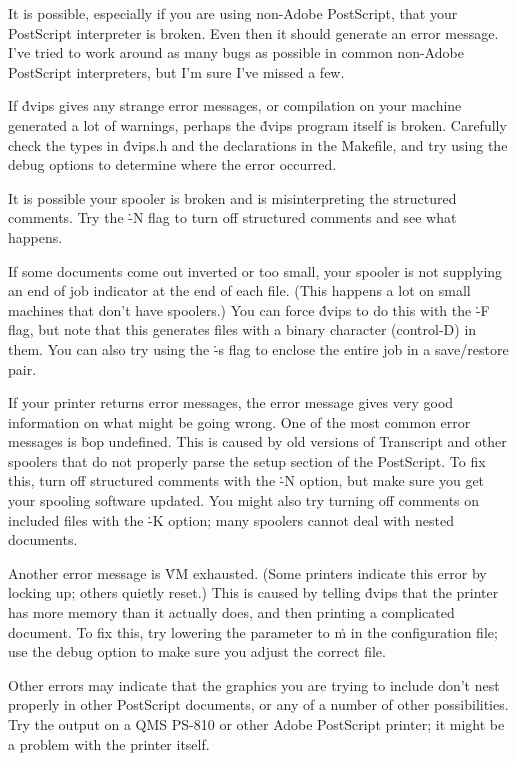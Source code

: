 It is possible, especially if you are using non-Adobe PostScript,
that your PostScript interpreter is broken.  Even then it should
generate an error message.  I've tried to work around as many bugs
as possible in common non-Adobe PostScript interpreters, but I'm
sure I've missed a few.

If \.{dvips} gives any strange error messages, or compilation on your
machine generated a lot of warnings, perhaps the \.{dvips} program
itself is broken.  Carefully check the types in \.{dvips.h} and
the declarations in the \.{Makefile}, and try using the debug options
to determine where the error occurred.

It is possible your spooler is broken and is misinterpreting the
structured comments.  Try the \.{-N} flag to turn off
structured comments and see what happens.


If some documents come out inverted or too small, your spooler is not
supplying an end of job indicator at the end of each file.  (This happens
a lot on small machines that don't have spoolers.)  You can
force \.{dvips} to do this with the \.{-F} flag, but note that this
generates files with a binary character (control-D) in them.  You can
also try using the \.{-s} flag to enclose the entire job in a save/restore
pair.


If your printer returns error messages, the error message gives very
good information on what might be going wrong.  One of the most common
error messages is \.{bop undefined}.  This is caused by old versions
of Transcript and other spoolers that do not properly parse the setup
section of the PostScript.  To fix this, turn off structured comments
with the \.{-N} option, but make sure you get your spooling software
updated.  You might also try turning off comments on included files
with the \.{-K} option; many spoolers cannot deal with nested
documents.

Another error message is \.{VM exhausted}.  (Some printers indicate
this error by locking up; others quietly reset.)  This is caused by telling
\.{dvips} that the printer has more memory than it actually does, and
then printing a complicated document.  To fix this, try lowering the
parameter to \.{m} in the configuration file; use the debug option
to make sure you adjust the correct file.

Other errors may indicate that the graphics you are trying to include
don't nest properly in other PostScript documents, or any of a number of
other possibilities.  Try the output on a QMS PS-810 or other Adobe
PostScript printer; it might be a problem with the printer itself.

